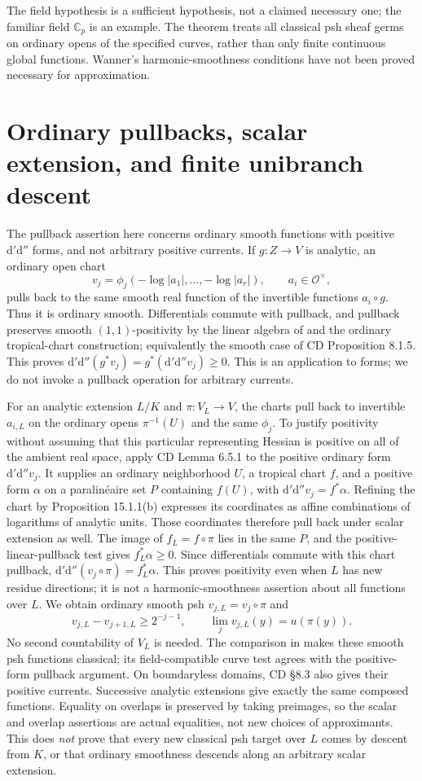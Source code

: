 \documentclass[11pt]{article}
\theoremstyle{remark}
\newcommand{\dd}{\mathrm d'\mathrm d''}
\begin{document}
The field hypothesis is a sufficient hypothesis, not a claimed necessary
one; the familiar field $\mathbb C_p$ is an example. The theorem treats all
classical psh sheaf germs on ordinary opens of the specified curves, rather
than only finite continuous global functions. Wanner's harmonic-smoothness
conditions have not been proved necessary for approximation.

\section{Ordinary pullbacks, scalar extension, and finite unibranch descent}
The pullback assertion here concerns ordinary smooth functions with positive
$\dd$ forms, and not arbitrary positive currents. If $g:Z\to V$ is analytic,
an ordinary open chart
\[
 v_j=\phi_j(-\log|a_1|,\ldots,-\log|a_r|),\qquad a_i\in\mathcal O^\times,
\]
pulls back to the same smooth real function of the invertible functions
$a_i\circ g$. Thus it is ordinary smooth. Differentials commute with
pullback, and pullback preserves smooth $(1,1)$-positivity by the linear
algebra of \cite[Lemma 1.2.11]{CD} and the ordinary tropical-chart
construction; equivalently the smooth case of CD Proposition 8.1.5.
This proves $\dd(g^*v_j)=g^*(\dd v_j)\geq0$. This is an application to
forms; we do not invoke a pullback operation for arbitrary currents.

For an analytic extension $L/K$ and $\pi:V_L\to V$, the charts pull back
to invertible $a_{i,L}$ on the ordinary opens $\pi^{-1}(U)$ and the same
$\phi_j$. To justify positivity without assuming that this particular
representing Hessian is positive on all of the ambient real space, apply
CD Lemma 6.5.1 to the positive ordinary form $\dd v_j$. It supplies an
ordinary neighborhood $U$, a tropical chart $f$, and a positive form
$\alpha$ on a paralin\'eaire set $P$ containing $f(U)$, with
$\dd v_j=f^*\alpha$. Refining the chart by Proposition 15.1.1(b)
expresses its coordinates as affine combinations of logarithms of
analytic units. Those coordinates therefore pull back under scalar
extension as well. The image of $f_L=f\circ\pi$ lies in the same $P$,
and the positive-linear-pullback test gives $f_L^*\alpha\geq0$.
Since differentials commute with this chart pullback,
$\dd(v_j\circ\pi)=f_L^*\alpha$. This proves positivity even when $L$
has new residue directions; it is not a harmonic-smoothness assertion
about all functions over $L$.
We obtain ordinary smooth psh $v_{j,L}=v_j\circ\pi$ and
\[
 v_{j,L}-v_{j+1,L}\geq2^{-j-1},\qquad
 \lim_jv_{j,L}(y)=u(\pi(y)).
\]
No second countability of $V_L$ is needed. The comparison in \cite[1.2]{GR}
makes these smooth psh functions classical; its field-compatible curve
test agrees with the positive-form pullback argument. On boundaryless
domains, CD \S8.3 also gives their positive currents. Successive analytic
extensions give exactly the same composed functions. Equality on overlaps
is preserved by taking preimages, so the scalar and overlap assertions
are actual equalities, not new choices of approximants.
This does \emph{not} prove that every new classical psh target over $L$
comes by descent from $K$, or that ordinary smoothness descends along an
arbitrary scalar extension.
\end{document}
